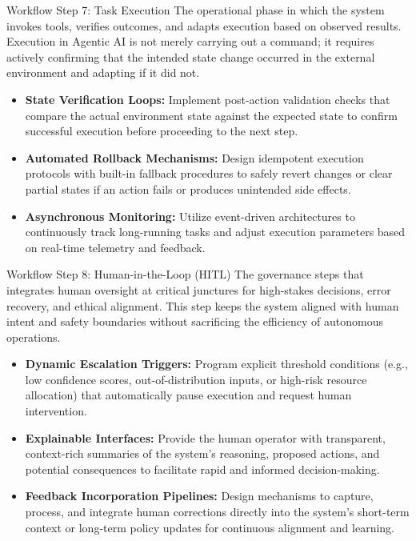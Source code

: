 \documentclass[
11pt,notheorems,hyperref={pdfauthor=whatever}
]{beamer}
\begin{document}
\begin{frame}{Workflow Step 7: Task Execution}
	The operational phase in which the system invokes tools, verifies outcomes, and adapts execution based on observed results. Execution in Agentic AI is not merely carrying out a command; it requires actively confirming that the intended state change occurred in the external environment and adapting if it did not.
	
	\vspace{0.3cm}
	
	\begin{itemize}
		\item \textbf{State Verification Loops:} Implement post-action validation checks that compare the actual environment state against the expected state to confirm successful execution before proceeding to the next step.
		\item \textbf{Automated Rollback Mechanisms:} Design idempotent execution protocols with built-in fallback procedures to safely revert changes or clear partial states if an action fails or produces unintended side effects.
		\item \textbf{Asynchronous Monitoring:} Utilize event-driven architectures to continuously track long-running tasks and adjust execution parameters based on real-time telemetry and feedback.
	\end{itemize}
\end{frame}

\begin{frame}{Workflow Step 8: Human-in-the-Loop (HITL)}
	The governance steps that integrates human oversight at critical junctures for high-stakes decisions, error recovery, and ethical alignment. This step keeps the system aligned with human intent and safety boundaries without sacrificing the efficiency of autonomous operations.
	
	\vspace{0.3cm}
	
	\begin{itemize}
		\item \textbf{Dynamic Escalation Triggers:} Program explicit threshold conditions (e.g., low confidence scores, out-of-distribution inputs, or high-risk resource allocation) that automatically pause execution and request human intervention.
		\item \textbf{Explainable Interfaces:} Provide the human operator with transparent, context-rich summaries of the system's reasoning, proposed actions, and potential consequences to facilitate rapid and informed decision-making.
		\item \textbf{Feedback Incorporation Pipelines:} Design mechanisms to capture, process, and integrate human corrections directly into the system's short-term context or long-term policy updates for continuous alignment and learning.
	\end{itemize}
\end{frame}
\end{document}
